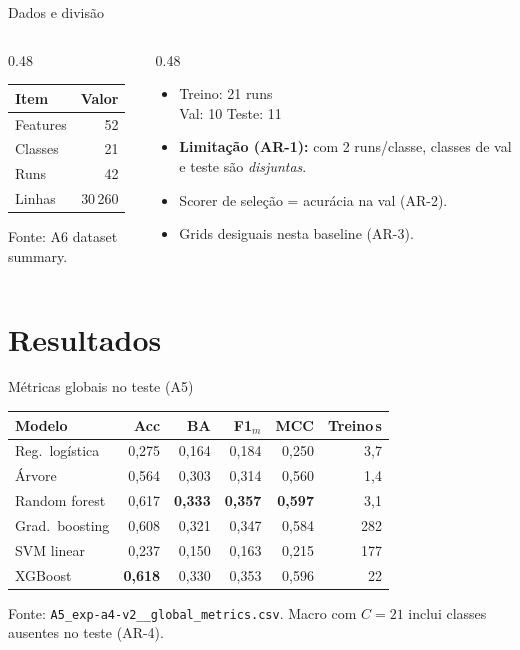\documentclass[aspectratio=169,11pt]{beamer}
\begin{document}
\begin{frame}{Dados e divisão}
\begin{columns}[T]
\begin{column}{0.48\textwidth}
\begin{tabular}{lr}
\toprule
Item & Valor \\
\midrule
Features & 52 \\
Classes & 21 \\
Runs & 42 \\
Linhas & 30\,260 \\
\bottomrule
\end{tabular}
\bigskip
{\scriptsize Fonte: A6 dataset summary.}
\end{column}
\begin{column}{0.48\textwidth}
\begin{itemize}
  \item Treino: 21 runs\\
        Val: 10 \quad Teste: 11
  \item \textbf{Limitação (AR-1):} com 2 runs/classe,
        classes de val e teste são \emph{disjuntas}.
  \item Scorer de seleção = acurácia na val (AR-2).
  \item Grids desiguais nesta baseline (AR-3).
\end{itemize}
\end{column}
\end{columns}
\end{frame}

\section{Resultados}
\begin{frame}{Métricas globais no teste (A5)}
{\small
\begin{tabular}{lrrrrr}
\toprule
Modelo & Acc & BA & F1$_m$ & MCC & Treino\,s \\
\midrule
Reg.\ logística & 0,275 & 0,164 & 0,184 & 0,250 & 3,7 \\
Árvore & 0,564 & 0,303 & 0,314 & 0,560 & 1,4 \\
Random forest & 0,617 & \textbf{0,333} & \textbf{0,357} & \textbf{0,597} & 3,1 \\
Grad.\ boosting & 0,608 & 0,321 & 0,347 & 0,584 & 282 \\
SVM linear & 0,237 & 0,150 & 0,163 & 0,215 & 177 \\
XGBoost & \textbf{0,618} & 0,330 & 0,353 & 0,596 & 22 \\
\bottomrule
\end{tabular}
}
\bigskip
{\scriptsize Fonte: \texttt{A5\_exp-a4-v2\_\_global\_metrics.csv}. Macro com $C{=}21$
inclui classes ausentes no teste (AR-4).}
\end{frame}
\end{document}
